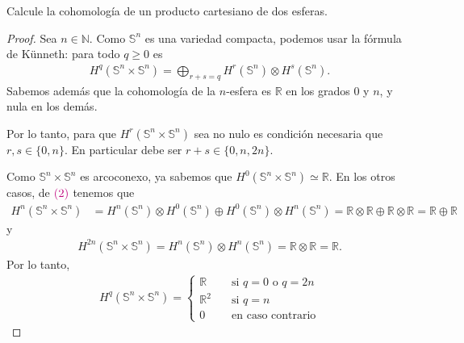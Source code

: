 \documentclass[11pt]{article}
\newcommand{\N}{\mathbb{N}}
\newcommand{\R}{\mathbb{R}}
\newcommand{\Ss}{\mathbb{S}}
\newcommand{\paint}[1]{\color{color}{#1}}
\newenvironment{exercise}[2][Ejercicio]{\begin{trivlist}
\item[\hskip \labelsep \paint{{\bfseries #1}}\hskip \labelsep {\bfseries #2.}]}{\end{trivlist}}
\begin{document}
\begin{exercise}{11 (d)} Calcule la cohomología de un producto cartesiano de dos esferas.
\begin{proof} Sea $n \in \N$. Como $\Ss^n$ es una variedad compacta, podemos usar la fórmula de Künneth: para todo $q \geq 0$ es 
\begin{align}
H^q(\Ss^n \times \Ss^n) = \bigoplus_{r+s = q} H^r(\Ss^n) \otimes H^s(\Ss^n).
\end{align}
Sabemos además que la cohomología de la $n$-esfera es $\R$ en los grados $0$ y $n$, y nula en los demás.

Por lo tanto, para que $H^r(\Ss^n \times \Ss^n)$ sea no nulo es condición necesaria que $r,s \in \{0,n\}$. En particular debe ser $r+s \in \{0,n,2n\}$. 

Como $\Ss^n \times  \Ss^n$ es arcoconexo, ya sabemos que $H^0(\Ss^n \times \Ss^n) \simeq \R$. En los otros casos, de $\paint{(2)}$ tenemos que
\begin{align*}
H^n(\Ss^n \times \Ss^n) &= H^n(\Ss^n) \otimes H^0(\Ss^n) \oplus H^0(\Ss^n) \otimes H^n(\Ss^n) = \R \otimes \R \oplus \R \otimes \R = \R \oplus \R
\end{align*}
y
\begin{align*}
H^{2n}(\Ss^n \times \Ss^n) = H^n(\Ss^n) \otimes H^n(\Ss^n) = \R \otimes \R = \R.
\end{align*}
Por lo tanto,
\begin{align*}
H^q(\Ss^n \times \Ss^n) = \begin{cases}
\R \quad &\text{si $q = 0$ o $q = 2n$}\\
\R^2 \quad &\text{si $q = n$}\\
0 \quad &\text{en caso contrario}
\end{cases}
\end{align*}
\end{proof}
\end{exercise}
\end{document}
